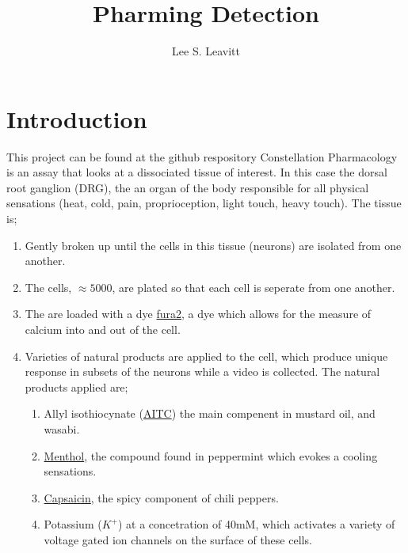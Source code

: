 \documentclass[11pt, fullpage,letterpaper]{article}
\title{Pharming Detection \semester}
\author{Lee S. Leavitt}
\begin{document}
\maketitle
\newcommand{\Hcal}{\mathcal{H}} 

\section{Introduction}
This project can be found at the github respository \href {}{}Constellation Pharmacology is an assay that looks at a dissociated tissue of interest. In this case the dorsal root ganglion (DRG), the an organ of the body responsible for all physical sensations (heat, cold, pain, proprioception, light touch, heavy touch). The tissue is;
\begin{enumerate}	
\item Gently broken up until the cells in this tissue (neurons) are isolated from one another. 
\item The cells, $\approx 5000$, are plated so that each cell is seperate from one another.
\item The are loaded with a dye \href{https://www.ncbi.nlm.nih.gov/pmc/articles/PMC2763293/}{fura2}, a dye which allows for the measure of calcium into and out of the cell.
\item Varieties of natural products are applied to the cell, which produce unique response in subsets of the neurons while a video is collected. The natural products applied are;
	\begin{enumerate}
		\item Allyl isothiocynate (\href{https://en.wikipedia.org/wiki/Allyl_isothiocyanate}{AITC}) the main compenent in mustard oil, and wasabi.
		\item \href{https://en.wikipedia.org/wiki/Menthol}{Menthol}, the compound found in peppermint which evokes a cooling sensations. 
		\item \href{https://en.wikipedia.org/wiki/Capsaicin}{Capsaicin}, the spicy component of chili peppers. 
		\item Potassium ($K^+$) at a concetration of 40mM, which activates a variety of voltage gated ion channels on the surface of these cells.
		\begin{center}

\end{center}
\end{enumerate}
\end{enumerate}
\end{document}
